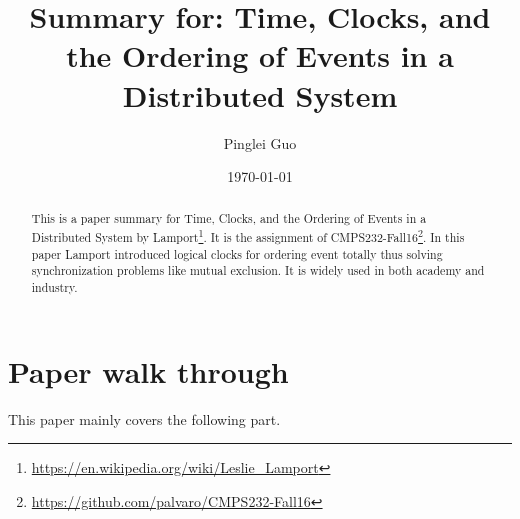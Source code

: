 \documentclass[12pt,a4paper,oneside]{article}
\title{Summary for: Time, Clocks, and the Ordering of Events in a Distributed System}
\author{Pinglei Guo}
\date{\today}
\begin{document}
\maketitle

\begin{abstract}

This is a paper summary for Time, Clocks, and the Ordering of Events in a Distributed System\cite{l} by Lamport\footnote{\url{https://en.wikipedia.org/wiki/Leslie_Lamport}}.
It is the assignment of CMPS232-Fall16\footnote{\url{https://github.com/palvaro/CMPS232-Fall16}}.
In this paper Lamport introduced logical clocks for ordering event totally thus solving synchronization problems like mutual exclusion.
It is widely used in both academy and industry.

\end{abstract}

\section{Paper walk through}

This paper mainly covers the following part.
\end{document}
